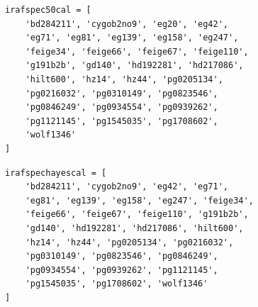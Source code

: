 \documentclass[fleqn,usenatbib]{mnras}
\begin{document}
\begin{verbatim}
irafspec50cal = [
    'bd284211', 'cygob2no9', 'eg20', 'eg42',
    'eg71', 'eg81', 'eg139', 'eg158', 'eg247',
    'feige34', 'feige66', 'feige67', 'feige110',
    'g191b2b', 'gd140', 'hd192281', 'hd217086',
    'hilt600', 'hz14', 'hz44', 'pg0205134',
    'pg0216032', 'pg0310149', 'pg0823546',
    'pg0846249', 'pg0934554', 'pg0939262',
    'pg1121145', 'pg1545035', 'pg1708602',
    'wolf1346'
]
\end{verbatim}

\begin{verbatim}
irafspechayescal = [
    'bd284211', 'cygob2no9', 'eg42', 'eg71',
    'eg81', 'eg139', 'eg158', 'eg247', 'feige34',
    'feige66', 'feige67', 'feige110', 'g191b2b',
    'gd140', 'hd192281', 'hd217086', 'hilt600',
    'hz14', 'hz44', 'pg0205134', 'pg0216032',
    'pg0310149', 'pg0823546', 'pg0846249',
    'pg0934554', 'pg0939262', 'pg1121145',
    'pg1545035', 'pg1708602', 'wolf1346'
]
\end{verbatim}



\bsp	%
\label{lastpage}
\end{document}
